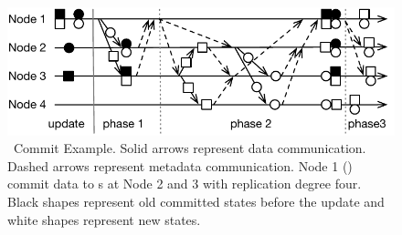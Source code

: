 {
\begin{figure}[th]
\begin{center}
\centerline{\includegraphics[width=\textwidth]{hotpot/Figures/commit.pdf}}
\caption[\mrmw\ Commit Example.]
{
\mrmw\ Commit Example.
Solid arrows represent data communication.
Dashed arrows represent metadata communication.
Node 1 (\xn) commit data to \on{}s at Node 2 and 3 with replication degree four.
Black shapes represent old committed states before the update
and white shapes represent new states.
}
\label{fig-mrmw}
\end{center}
\end{figure}
}